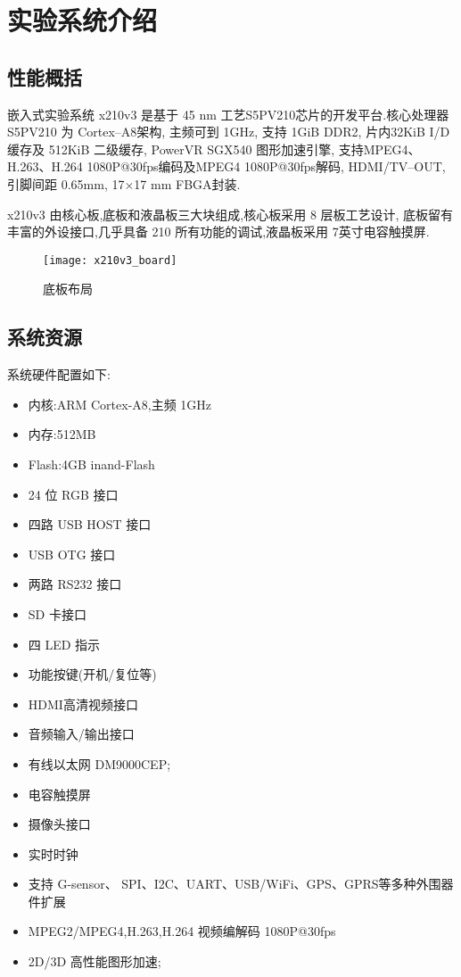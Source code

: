 \chapter{实验系统介绍}

\section{性能概括}

	嵌入式实验系统 x210v3 是基于 45 nm 工艺S5PV210芯片的开发平台.核心处理器
S5PV210 为 Cortex--A8架构, 主频可到 1GHz, 支持 1GiB DDR2, 片内32KiB I/D 缓存及
512KiB 二级缓存, PowerVR SGX540 图形加速引擎, 支持MPEG4、H.263、H.264 
1080P@30fps编码及MPEG4 1080P@30fps解码, HDMI/TV--OUT, 引脚间距 0.65mm, 
17$\times$17 mm FBGA封装.

	x210v3 由核心板,底板和液晶板三大块组成,核心板采用 8 层板工艺设计,  底板留有
丰富的外设接口,几乎具备 210 所有功能的调试,液晶板采用 7英寸电容触摸屏.

\begin{figure}
\centering
\texttt{[image: x210v3\_board]}
\caption{底板布局}
\end{figure}

\section{系统资源}

	系统硬件配置如下:

\begin{itemize}\itemsep=-3pt
  \item 内核:ARM Cortex-A8,主频 1GHz
  \item 内存:512MB
  \item Flash:4GB inand-Flash
  \item 24 位 RGB 接口
  \item 四路 USB HOST 接口
  \item USB OTG 接口
  \item 两路 RS232 接口
  \item SD 卡接口
  \item 四 LED 指示
  \item 功能按键(开机/复位等)
  \item HDMI高清视频接口
  \item 音频输入/输出接口
  \item 有线以太网 DM9000CEP;
  \item 电容触摸屏
  \item 摄像头接口
  \item 实时时钟
  \item 支持 G-sensor、 SPI、I2C、UART、USB/WiFi、GPS、GPRS等多种外围器件扩展
  \item MPEG2/MPEG4,H.263,H.264 视频编解码 1080P@30fps
  \item 2D/3D 高性能图形加速;
\end{itemize}


